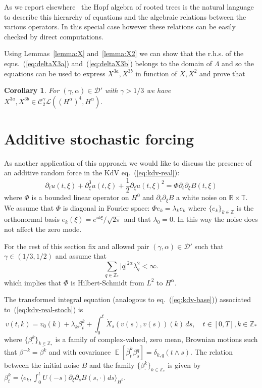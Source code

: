 \documentclass[a4paper,12pt,reqno]{article}
\DeclareMathOperator{\expect}{{\mathbb E}}
\newcommand{\RR}{\mathbb{R}}
\newcommand{\TT}{\mathbb{T}}
\newcommand{\CC}{\mathcal{C}}
\newcommand{\DD}{\mathcal{D}}
\newcommand{\LL}{\mathcal{L}}
\newcommand{\ZZ}{\mathbb{Z}}
\newtheorem{corollary}[theorem]{Corollary}
\begin{document}
As we report elsewhere~\cite{trees}  the Hopf algebra of rooted trees is
the natural language to describe this hierarchy of equations and the
algebraic relations between the various operators. In this special
case however these relations can be easily checked by direct 
 computations. 

Using Lemmas~\ref{lemma:X} and~\ref{lemma:X2} we can show that the r.h.s. of
the eqns.~(\ref{eq:deltaX3a}) and~(\ref{eq:deltaX3b}) belongs to the
domain of $\Lambda$ and so the equations can be used to express
$X^{3a},X^{3b}$ in function of $X,X^2$ and prove that

\begin{corollary}
For $(\gamma,\alpha) \in\DD'$ with $\gamma>1/3$ we have
$X^{3a},X^{3b} \in \CC_2^\gamma \LL((H^{\alpha})^4,H^{\alpha}).$ 
\end{corollary}




\section{Additive stochastic forcing}
\label{sec:stoch}
As another application of this approach we would like to discuss the presence of an additive random force in the KdV eq.~(\ref{eq:kdv-real}):
\begin{equation}
  \label{eq:kdv-real-stoch}
\partial_t u(t,\xi) + \partial^3_\xi u(t,\xi) +
\frac12 \partial_\xi u(t,\xi)^2 = \Phi \partial_t  \partial_\xi B(t,\xi)
\end{equation}
where $\Phi$ is a bounded linear operator on $H^0$ and
$\partial_t \partial_\xi B$ a white noise on $\RR\times\TT$.
We assume that $\Phi$ is diagonal in Fourier space: $\Phi e_k =
\lambda_k e_k$ where $\{e_k \}_{k\in\ZZ}$ is the orthonormal basis
$e_k(\xi) = e^{ik\xi}/\sqrt{2\pi}$ and that $\lambda_0 = 0$.  In this
way the noise does not affect the zero mode.

For the rest of this section  fix and allowed pair $(\gamma,\alpha)
\in \DD'$ such that $\gamma \in (1/3,1/2)$ and assume that
\begin{equation}
  \label{eq:lambda-bound}
\sum_{q \in \ZZ_*}  |q|^{2\alpha} \lambda_q^2 < \infty.
\end{equation}
which implies that $\Phi$ is  Hilbert-Schmidt  from $L^2$ to
$H^\alpha$.

The transformed integral equation (analogous to
eq.~(\ref{eq:kdv-base})) associated to~(\ref{eq:kdv-real-stoch}) is
\begin{equation}
  \label{eq:kdv-base-stoch}
 v(t,k) =   v_0(k) + \lambda_k \beta^k_t +  \int_0^t \dot X_s(
  v(s), v(s))(k) \, ds, \quad t \in [0,T], k \in \ZZ_* 
\end{equation}
where $\{\beta^k_\cdot\}_{k \in \ZZ_*}$ is a family of 
complex-valued, zero mean, Brownian motions such that $\beta^{-k} =
\overline{\beta^k}$ and with covariance
$\expect[\overline \beta^k_t \beta^q_s] = \delta_{k,q} (t\wedge s)$. 
The relation between the initial noise $B$ and the family $\{\beta^k_\cdot\}_{k \in \ZZ_*}$ is given by 
$
\beta^k_t = \langle e_k, \int_0^t U(-s) \partial_\xi \partial_s B(s,\cdot) ds \rangle_{H^0} 
$.
\end{document}
